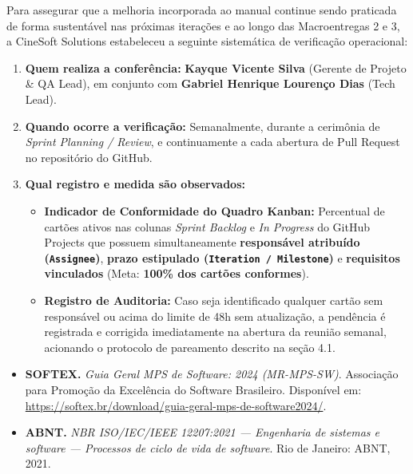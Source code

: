 
Para assegurar que a melhoria incorporada ao manual continue sendo praticada de forma sustentável nas próximas iterações e ao longo das Macroentregas 2 e 3, a CineSoft Solutions estabeleceu a seguinte sistemática de verificação operacional:

\begin{enumerate}
\item \textbf{Quem realiza a conferência:} \textbf{Kayque Vicente Silva} (Gerente de Projeto \& QA Lead), em conjunto com \textbf{Gabriel Henrique Lourenço Dias} (Tech Lead).
\item \textbf{Quando ocorre a verificação:} Semanalmente, durante a cerimônia de \emph{Sprint Planning / Review}, e continuamente a cada abertura de Pull Request no repositório do GitHub.
\item \textbf{Qual registro e medida são observados:}
\begin{itemize}
\item \textbf{Indicador de Conformidade do Quadro Kanban:} Percentual de cartões ativos nas colunas \emph{Sprint Backlog} e \emph{In Progress} do GitHub Projects que possuem simultaneamente \textbf{responsável atribuído (\texttt{Assignee})}, \textbf{prazo estipulado (\texttt{Iteration \allowbreak\hspace{0pt plus 1pt}/\allowbreak\hspace{0pt plus 1pt} \allowbreak\hspace{0pt plus 1pt}Milestone})} e \textbf{requisitos vinculados} (Meta: \textbf{100\% dos cartões conformes}).
\item \textbf{Registro de Auditoria:} Caso seja identificado qualquer cartão sem responsável ou acima do limite de 48h sem atualização, a pendência é registrada e corrigida imediatamente na abertura da reunião semanal, acionando o protocolo de pareamento descrito na seção 4.1.
\end{itemize}
\end{enumerate}


\begin{itemize}
\item \textbf{SOFTEX.} \emph{Guia Geral MPS de Software: 2024 (MR-MPS-SW)}. Associação para Promoção da Excelência do Software Brasileiro. Disponível em: \url{https://softex.br/download/guia-geral-mps-de-software2024/}.
\item \textbf{ABNT.} \emph{NBR ISO/IEC/IEEE 12207:2021 — Engenharia de sistemas e software — Processos de ciclo de vida de software}. Rio de Janeiro: ABNT, 2021.
\end{itemize}

